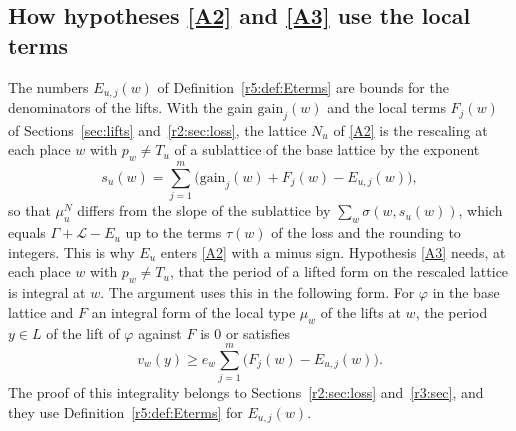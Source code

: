 \subsection{How hypotheses \texorpdfstring{\eqref{A2}}{(A2)} and \texorpdfstring{\eqref{A3}}{(A3)} use the local terms}\label{r5:sec:R5interface}

The numbers $E_{u,j}(w)$ of Definition~\ref{r5:def:Eterms} are bounds for the denominators of the lifts. With the gain $\mathrm{gain}_j(w)$ and the local terms $F_j(w)$ of Sections~\ref{sec:lifts} and~\ref{r2:sec:loss}, the lattice $N_u$ of \eqref{A2} is the rescaling at each place $w$ with $p_w\ne T_u$ of a sublattice of the base lattice by the exponent
\[
s_u(w)=\sum_{j=1}^m\big(\mathrm{gain}_j(w)+F_j(w)-E_{u,j}(w)\big),
\]
so that $\mu^N_u$ differs from the slope of the sublattice by $\sum_w\sigma(w,s_u(w))$, which equals $\Gamma+\mathcal L-E_u$ up to the terms $\tau(w)$ of the loss and the rounding to integers. This is why $E_u$ enters \eqref{A2} with a minus sign. Hypothesis \eqref{A3} needs, at each place $w$ with $p_w\ne T_u$, that the period of a lifted form on the rescaled lattice is integral at $w$. The argument uses this in the following form. For $\varphi$ in the base lattice and $F$ an integral form of the local type $\mu_w$ of the lifts at $w$, the period $y\in L$ of the lift of $\varphi$ against $F$ is $0$ or satisfies
\[
v_w(y)\ge e_w\sum_{j=1}^m\big(F_j(w)-E_{u,j}(w)\big).
\]
The proof of this integrality belongs to Sections~\ref{r2:sec:loss} and~\ref{r3:sec}, and they use Definition~\ref{r5:def:Eterms} for $E_{u,j}(w)$.

